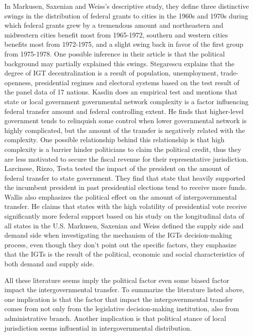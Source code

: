 In Markusen, Saxenian and Weiss's \cite{markusen1981benefits} descriptive study, they define three distinctive swings in the distribution of federal grants to cities in the 1960s and 1970s during which federal grants grew by a tremendous amount and northeastern and midwestern cities benefit most from 1965-1972, southern and western cities benefits most from 1972-1975, and a slight swing back in favor of the first group from 1975-1978. One possible inference in their article is that the political background may partially explained this swings. Stegarescu \cite{stegarescu2006decentralised} explains that the degree of IGT decentralization is a result of population, unemployment, trade-openness, presidential regimes and electoral systems based on the test result of the panel data of 17 nations. Kasdin \cite{kasdin2016decision} does an empirical test and mentions that state or local government governmental network complexity is a factor influencing federal transfer amount and federal controlling extent. He finds that higher-level government tends to relinquish some control when lower governmental network is highly complicated, but the amount of the transfer is negatively related with the complexity. One possible relationship behind this relationship is that high complexity is a barrier hinder politicians to claim the political credit, thus they are less motivated to secure the fiscal revenue for their representative jurisdiction. Larcinese, Rizzo, Testa \cite{larcinese2006allocating} tested the impact of the president on the amount of federal transfer to state government. They find that state that heavily supported the incumbent president in past presidential elections tend to receive more funds. Wallis \cite{wallis1987employment} also emphasizes the political effect on the amount of intergovernmental transfer. He claims that states with the high volatility of presidential vote receive significantly more federal support based on his study on the longitudinal data of all states in the U.S. Markusen, Saxenian and Weiss \cite{markusen1981benefits} defined the supply side and demand side when investigating the mechanism of the IGTs decision-making process, even though they don’t point out the specific factors, they emphasize that the IGTs is the result of the political, economic and social characteristics of both demand and supply side.

All these literature seems imply the political factor even some biased factor impact the intergovernmental transfer. To summarize the literature listed above, one implication is that the factor that impact the intergovernmental transfer comes from not only from the legislative decision-making institution, also from administrative branch. Another implication is that political stance of local jurisdiction seems influential in intergovernmental distribution. 

